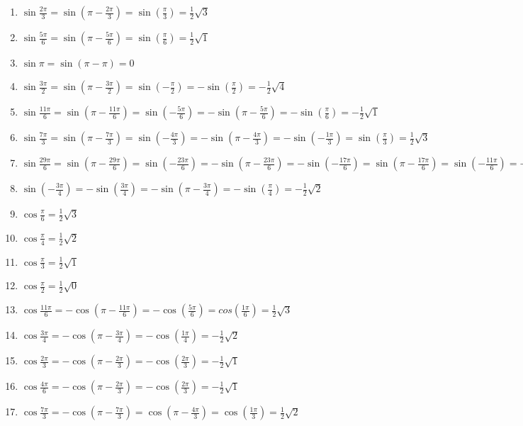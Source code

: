 \begin{enumerate}
\begin{enumerate}
  	 \item $\sin \frac{2\pi}{3} = \sin(\pi - \frac{2\pi}{3}) = \sin(\frac{\pi}{3}) = \frac{1}{2}\sqrt{3}$
		 \item $\sin \frac{5\pi}{6} = \sin(\pi - \frac{5\pi}{6}) = \sin(\frac{\pi}{6}) = \frac{1}{2}\sqrt{1}$
   	\item $\sin \pi = \sin (\pi - \pi) = 0$
   	\item $\sin \frac{3\pi}{2} = \sin(\pi - \frac{3\pi}{2}) = \sin(-\frac{\pi}{2}) = -\sin (\frac{\pi}{2})=- \frac{1}{2} \sqrt{4}$
   	\item $\sin \frac{11\pi}{6} =\sin(\pi - \frac{11\pi}{6}) = \sin(-\frac{5\pi}{6}) = -\sin (\pi - \frac{5\pi}{6})= -\sin (\frac{\pi}{6}) = -\frac{1}{2}\sqrt{1}$
   \item $\sin \frac{7\pi}{3} =\sin(\pi - \frac{7\pi}{3}) = \sin(-\frac{4\pi}{3}) = -\sin (\pi - \frac{4\pi}{3})= -\sin (-\frac{1\pi}{3}) = \sin (\frac{\pi}{3}) = \frac{1}{2}\sqrt{3}$
   \item $\sin \frac{29\pi}{6} =\sin(\pi - \frac{29\pi}{6}) = \sin(-\frac{23\pi}{6}) = -\sin (\pi - \frac{23\pi}{6})= -\sin (-\frac{17\pi}{6}) = \sin(\pi - \frac{17\pi}{6}) = \sin(-\frac{11\pi}{6}) = -\sin (\pi - \frac{11\pi}{6})= -\sin (-\frac{5\pi}{6}) = \sin (\pi - \frac{5\pi}{6})= \sin (\frac{\pi}{6}) = \frac{1}{2}\sqrt{1}$
   \item $\sin (-\frac{3\pi}{4}) = -\sin (\frac{3\pi}{4}) = -\sin(\pi - \frac{3\pi}{4}) = -\sin(\frac{\pi}{4}) = -\frac{1}{2}\sqrt{2}$
   \item $\cos \frac{\pi}{6} = \frac{1}{2}\sqrt{3}$
   \item $\cos \frac{\pi}{4} = \frac{1}{2}\sqrt{2}$
   \item $\cos \frac{\pi}{3} = \frac{1}{2}\sqrt{1}$
   \item $\cos \frac{\pi}{2} = \frac{1}{2}\sqrt{0}$
   \item $\cos \frac{11\pi}{6} = -\cos (\pi -\frac{11\pi}{6}) = - \cos (\frac{5\pi}{6}) = cos(\frac{1\pi}{6}) = \frac{1}{2}\sqrt{3}$
   \item $\cos \frac{3\pi}{4} = -\cos (\pi -\frac{3\pi}{4}) = - \cos (\frac{1\pi}{4}) = - \frac{1}{2}\sqrt{2}$
   \item $\cos \frac{2\pi}{3} = -\cos (\pi - \frac{2\pi}{3}) = - \cos (\frac{2\pi}{3}) = - \frac{1}{2}\sqrt{1}$
   \item $\cos \frac{4\pi}{6} = -\cos (\pi - \frac{2\pi}{3})= - \cos (\frac{2\pi}{3}) = - \frac{1}{2}\sqrt{1}$
   \item $\cos \frac{7\pi}{3} = -\cos (\pi - \frac{7\pi}{3}) = \cos (\pi - \frac{4\pi}{3}) = \cos(\frac{1\pi}{3}) =  \frac{1}{2}\sqrt{2}$

\end{enumerate}
\end{enumerate}

